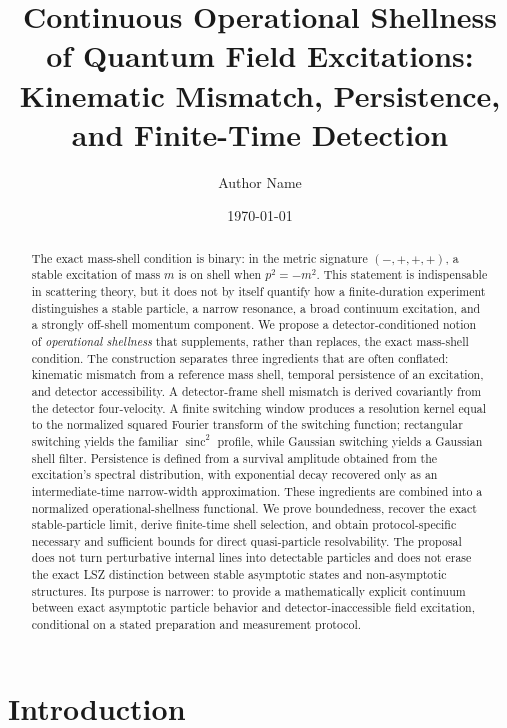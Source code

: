 \documentclass[11pt]{article}
\title{Continuous Operational Shellness of Quantum Field Excitations:\\
Kinematic Mismatch, Persistence, and Finite-Time Detection}
\author{Author Name}
\affil{Independent Research Draft}
\date{\today}
\theoremstyle{remark}
\newcommand{\sinc}{\operatorname{sinc}}
\begin{document}
\maketitle

\begin{abstract}
The exact mass-shell condition is binary: in the metric signature $(-,+,+,+)$, a stable excitation of mass $m$ is on shell when $p^2=-m^2$. This statement is indispensable in scattering theory, but it does not by itself quantify how a finite-duration experiment distinguishes a stable particle, a narrow resonance, a broad continuum excitation, and a strongly off-shell momentum component. We propose a detector-conditioned notion of \emph{operational shellness} that supplements, rather than replaces, the exact mass-shell condition. The construction separates three ingredients that are often conflated: kinematic mismatch from a reference mass shell, temporal persistence of an excitation, and detector accessibility. A detector-frame shell mismatch is derived covariantly from the detector four-velocity. A finite switching window produces a resolution kernel equal to the normalized squared Fourier transform of the switching function; rectangular switching yields the familiar $\sinc^2$ profile, while Gaussian switching yields a Gaussian shell filter. Persistence is defined from a survival amplitude obtained from the excitation's spectral distribution, with exponential decay recovered only as an intermediate-time narrow-width approximation. These ingredients are combined into a normalized operational-shellness functional. We prove boundedness, recover the exact stable-particle limit, derive finite-time shell selection, and obtain protocol-specific necessary and sufficient bounds for direct quasi-particle resolvability. The proposal does not turn perturbative internal lines into detectable particles and does not erase the exact LSZ distinction between stable asymptotic states and non-asymptotic structures. Its purpose is narrower: to provide a mathematically explicit continuum between exact asymptotic particle behavior and detector-inaccessible field excitation, conditional on a stated preparation and measurement protocol.
\end{abstract}

\tableofcontents

\section{Introduction}
\end{document}
